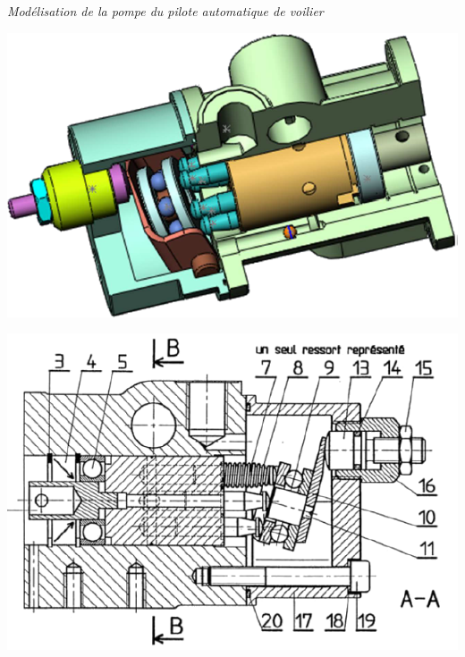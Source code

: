 \documentclass[10pt]{article}
\begin{document}
\begin{exemple}

\textit{Modélisation de la pompe du pilote automatique de voilier}

\noindent\begin{minipage}[c]{.45\linewidth}
\begin{center}
\includegraphics[width=.9\textwidth]{images/pompe1}
\end{center}
\end{minipage}\hfill
\begin{minipage}[c]{.45\linewidth}
\begin{center}
\includegraphics[width=.9\textwidth]{images/pompe2}
\end{center}
\end{minipage}


\end{exemple}
\end{document}
